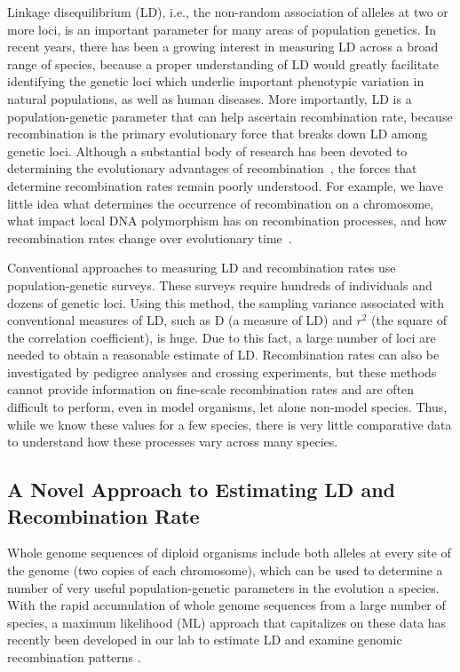 \documentclass{sig-alternate}
\begin{document}
Linkage disequilibrium (LD), i.e., the non-random association of alleles at two or more loci, is an important parameter for many areas of population genetics.  In recent years, there has been a growing interest in measuring LD across a broad range of species, because a proper understanding of LD would greatly facilitate identifying the genetic loci which underlie important phenotypic variation in natural populations, as well as human diseases. More importantly, LD is a population-genetic parameter that can help ascertain recombination rate, because recombination is the primary evolutionary force that breaks down LD among genetic loci. Although a substantial body of research has been devoted to determining the evolutionary advantages of recombination~\cite{resolving-paradox}, the forces that determine recombination rates remain poorly understood. For example, we have little idea what determines the occurrence of recombination on a chromosome, what impact local DNA polymorphism has on recombination processes, and how recombination rates change over evolutionary time~\cite{stumpf}. 

Conventional approaches to measuring LD and recombination rates use population-genetic surveys. These surveys require hundreds of individuals and dozens of genetic loci. Using this method, the sampling variance associated with conventional measures of LD, such as D (a measure of LD) and $r^2$ (the square of the correlation coefficient), is huge. Due to this fact, a large number of loci are needed to obtain a reasonable estimate of LD.  Recombination rates can also be investigated by pedigree analyses and crossing experiments, but these methods cannot provide information on fine-scale recombination rates and are often difficult to perform, even in model organisms, let alone non-model species. Thus, while we know these values for a few species, there is very little comparative data to understand how these processes vary across many species.

\subsection{ A Novel Approach to Estimating LD and Recombination Rate}\label{sec:migration}

Whole genome sequences of diploid organisms include both alleles at every site of the genome (two copies of each chromosome), which can be used to determine a number of very useful population-genetic parameters in the evolution a species. With the rapid accumulation of whole genome sequences from a large number of species, a maximum likelihood (ML) approach that capitalizes on these data has recently been developed in our lab to estimate LD and examine genomic recombination patterns \cite{Lynch01112008,MEC:MEC4482}.
\end{document}
